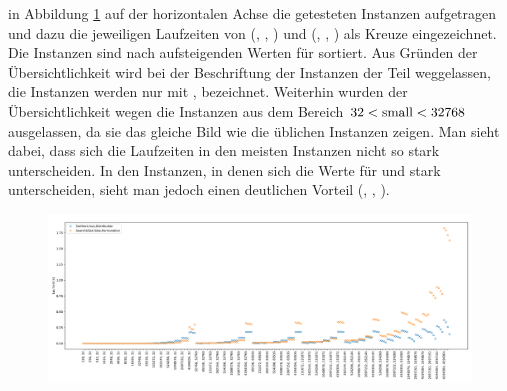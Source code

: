 in Abbildung \ref{fig:messung_small} auf der horizontalen Achse die getesteten Instanzen aufgetragen
und dazu die jeweiligen Laufzeiten von (\SorSor, \true, \perm) und (\SeaUSet, \false, \perm) als Kreuze
eingezeichnet. Die Instanzen sind nach aufsteigenden Werten für \sm{} sortiert. Aus Gründen der Übersichtlichkeit
wird bei  der Beschriftung der Instanzen der Teil \fr weggelassen, die Instanzen werden 
nur mit \la, \sm{} bezeichnet. Weiterhin wurden der
Übersichtlichkeit wegen die Instanzen aus dem Bereich $32 < \text{small}  <32768$ ausgelassen, da sie das gleiche
Bild wie die üblichen Instanzen zeigen.
Man sieht dabei, dass sich die Laufzeiten in den meisten Instanzen nicht so stark unterscheiden. In
den Instanzen, in denen sich die Werte für \sm{} und \la{} stark unterscheiden, sieht man jedoch einen 
deutlichen Vorteil (\SorSor, \true, \perm).


\begin{figure}[h]
\centering
	\includegraphics[width = \textwidth]{figures/small_aufsteigend.pdf}
	\caption{}
	\label{fig:messung_small}
\end{figure}







